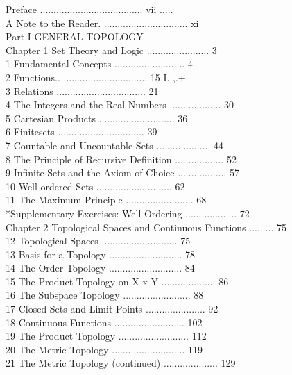 Preface ...................................... vii ..... \\
A Note to the Reader. ............................... xi \\
Part I GENERAL TOPOLOGY \\
Chapter 1 Set Theory and Logic ....................... 3 \\
1 Fundamental Concepts .......................... 4 \\
2 Functions.. ............................... 15 L ,.+ \\
3 Relations ................................. 21 \\
4 The Integers and the Real Numbers ................... 30 \\
5 Cartesian Products ............................ 36 \\
6 Finitesets ................................ 39 \\
7 Countable and Uncountable Sets .................... 44 \\
8 The Principle of Recursive Definition .................. 52 \\
9 Infinite Sets and the Axiom of Choice .................. 57 \\
10 Well-ordered Sets ............................ 62 \\
11 The Maximum Principle ......................... 68 \\
*Supplementary Exercises: Well-Ordering ................... 72  \\
Chapter 2 Topological Spaces and Continuous Functions ......... 75 \\
12 Topological Spaces ............................ 75 \\
13 Basis for a Topology ........................... 78 \\
14 The Order Topology ........................... 84 \\
15 The Product Topology on X x Y .................... 86 \\
16 The Subspace Topology ......................... 88 \\
17 Closed Sets and Limit Points ...................... 92 \\
18 Continuous Functions .......................... 102 \\
19 The Product Topology .......................... 112 \\
20 The Metric Topology ........................... 119 \\
21 The Metric Topology (continued) .................... 129 \\

